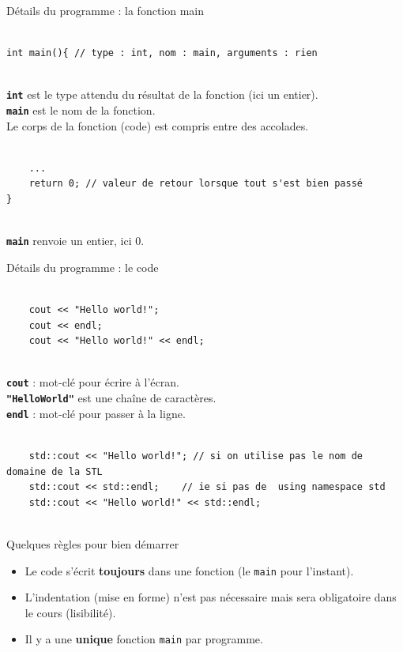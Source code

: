 \begin{frame}[fragile]{Détails du programme : la fonction main}

    \begin{verbatim}
        
int main(){ // type : int, nom : main, arguments : rien
        
    \end{verbatim}

    \texttt{\textbf{int}} est le type attendu du résultat de la fonction (ici un entier).\\
    \texttt{\textbf{main}} est le nom de la fonction.\\
    Le corps de la fonction (code) est compris entre des accolades.

    \begin{verbatim}
        
    ...
    return 0; // valeur de retour lorsque tout s'est bien passé
}
        
    \end{verbatim}
    \texttt{\textbf{main}} renvoie un entier, ici $0$.
\end{frame}


\begin{frame}[fragile]{Détails du programme : le code}
    \begin{verbatim}
        
    cout << "Hello world!";
    cout << endl;
    cout << "Hello world!" << endl;
        
    \end{verbatim}

    \texttt{\textbf{cout}} : mot-clé pour écrire à l'écran.\\
    \texttt{\textbf{"HelloWorld"}} est une chaîne de caractères.\\
    \texttt{\textbf{endl}} : mot-clé pour passer à la ligne.

    \begin{verbatim}
        
    std::cout << "Hello world!"; // si on utilise pas le nom de domaine de la STL
    std::cout << std::endl;    // ie si pas de  using namespace std
    std::cout << "Hello world!" << std::endl;
        
    \end{verbatim}
\end{frame}

\begin{frame}{Quelques règles pour bien démarrer}
    \begin{itemize}
        \item Le code s'écrit \textbf{toujours} dans une fonction (le \texttt{main} pour l'instant).
        \item L'indentation (mise en forme) n'est pas nécessaire mais sera obligatoire dans le cours (lisibilité).
        \item Il y a une \textbf{unique} fonction \texttt{main} par programme.
    \end{itemize}
\end{frame}

